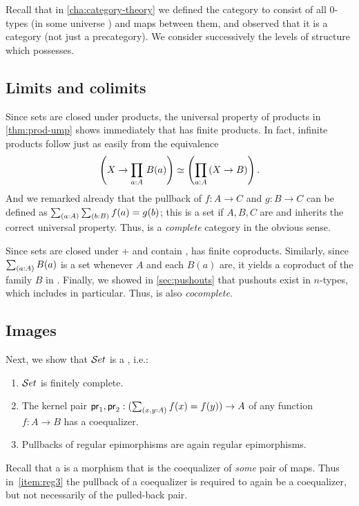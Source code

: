 Recall that in \autoref{cha:category-theory} we defined the category \uset to consist of all $0$-types (in some universe \UU) and maps between them, and observed that it is a category (not just a precategory).
We consider successively the levels of structure which \uset possesses.

\subsection{Limits and colimits}
\label{subsec:limits-sets}

Since sets are closed under products, the universal property of products in \autoref{thm:prod-ump} shows immediately that \uset has finite products.
In fact, infinite products follow just as easily from the equivalence
\[ \left(X\to \prd{a:A} B(a) \right) \simeq \left(\prd{a:A} (X\to B)\right) .\]
And we remarked already that the pullback of $f:A\to C$ and $g:B\to C$ can be defined as $\sm{a:A}{b:B} f(a)=g(b)$; this is a set if $A,B,C$ are and inherits the correct universal property.
Thus, \uset is a \emph{complete} category in the obvious sense.

Since sets are closed under $+$ and contain \emptyt, \uset has finite coproducts.
Similarly, since $\sm{a:A}B(a)$ is a set whenever $A$ and each $B(a)$ are, it yields a coproduct of the family $B$ in \uset.
Finally, we showed in \autoref{sec:pushouts} that pushouts exist in $n$-types, which includes \uset in particular.
Thus, \uset is also \emph{cocomplete}.

\subsection{Images}
\label{sec:image}

Next, we show that $\mathcal{S}et$ is a , i.e.:
%
\begin{enumerate}
\item $\mathcal{S}et$ is finitely complete.\label{item:reg1}
\item The kernel pair $\proj1,\proj2: (\sm{x,y:A} f(x)= f(y)) \to A$ of any
      function $f : A \to B$ has a coequalizer.\label{item:reg2}
\item Pullbacks of regular epimorphisms are again regular epimorphisms.\label{item:reg3}
\end{enumerate}
%
Recall that a  is a morphism that is the coequalizer of \emph{some} pair of maps.
Thus in~\ref{item:reg3} the pullback of a coequalizer is required to again be a coequalizer, but not necessarily of the pulled-back pair.

